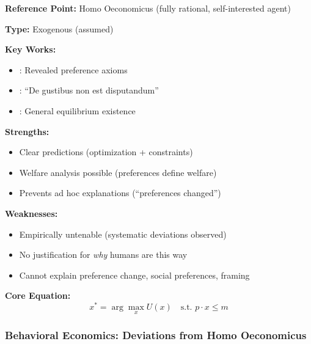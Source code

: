 \begin{tcolorbox}[colback=gray!5!white, colframe=gray!75!black]
\textbf{Reference Point:} Homo Oeconomicus (fully rational, self-interested agent)

\textbf{Type:} Exogenous (assumed)

\textbf{Key Works:}
\begin{itemize}[nosep]
    \item \citet{samuelson1947}: Revealed preference axioms
    \item \citet{stiglerbecker1977}: ``De gustibus non est disputandum''
    \item \citet{debreu1959}: General equilibrium existence
\end{itemize}

\textbf{Strengths:}
\begin{itemize}[nosep]
    \item Clear predictions (optimization + constraints)
    \item Welfare analysis possible (preferences define welfare)
    \item Prevents ad hoc explanations (``preferences changed'')
\end{itemize}

\textbf{Weaknesses:}
\begin{itemize}[nosep]
    \item Empirically untenable (systematic deviations observed)
    \item No justification for \emph{why} humans are this way
    \item Cannot explain preference change, social preferences, framing
\end{itemize}

\textbf{Core Equation:}
\begin{equation}
x^* = \arg\max_x U(x) \quad \text{s.t. } p \cdot x \leq m
\end{equation}
\end{tcolorbox}

\subsubsection{Behavioral Economics: Deviations from Homo Oeconomicus}

